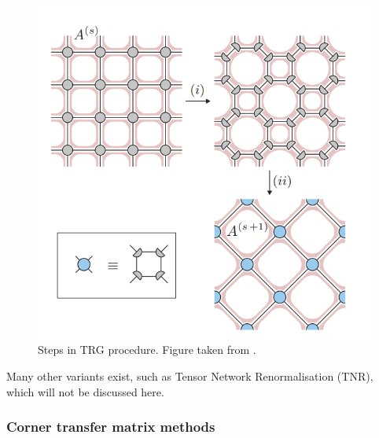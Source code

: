 \begin{figure}[h!]
    \center
    \includegraphics[width=0.8 \textwidth]{Figuren/tnalgs/TRG.png}
    \caption{ Steps in TRG procedure. Figure taken from \cite{Hauru}.  }
    \label{fig:tnalgs:trg}
\end{figure}
Many other variants exist, such as Tensor Network Renormalisation (TNR), which will not be discussed here.

\subsubsection{Corner transfer matrix  methods}


